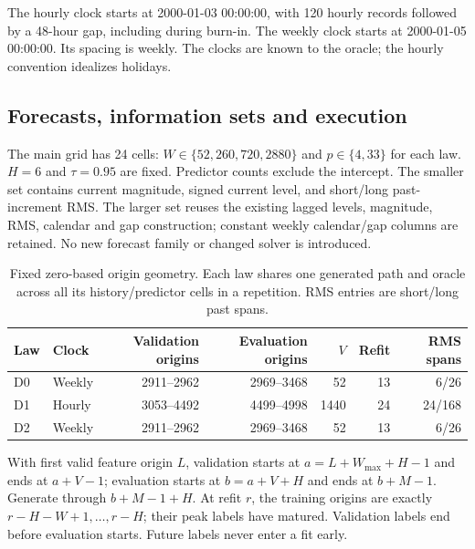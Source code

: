 The hourly clock starts at 2000-01-03 00:00:00, with 120 hourly records followed by a 48-hour gap, including during burn-in. The weekly clock starts at 2000-01-05 00:00:00. Its spacing is weekly. The clocks are known to the oracle; the hourly convention idealizes holidays.

\subsection{Forecasts, information sets and execution}\label{sup:v8-mc-procedure}

The main grid has 24 cells: $W\in\{52,260,720,2880\}$ and $p\in\{4,33\}$ for each law. $H=6$ and $\tau=0.95$ are fixed. Predictor counts exclude the intercept. The smaller set contains current magnitude, signed current level, and short/long past-increment RMS. The larger set reuses the existing lagged levels, magnitude, RMS, calendar and gap construction; constant weekly calendar/gap columns are retained. No new forecast family or changed solver is introduced.

\begin{table}[htbp]\centering\scriptsize

\caption{Fixed zero-based origin geometry. Each law shares one generated path and oracle across all its history/predictor cells in a repetition. RMS entries are short/long past spans.}\label{tab:v8-mc-geometry}

\begin{tabular}{llrrrrr}\toprule
Law & Clock & Validation origins & Evaluation origins & $V$ & Refit & RMS spans\\\midrule
D0 & Weekly & 2911--2962 & 2969--3468 & 52 & 13 & 6/26 \\
D1 & Hourly & 3053--4492 & 4499--4998 & 1440 & 24 & 24/168 \\
D2 & Weekly & 2911--2962 & 2969--3468 & 52 & 13 & 6/26 \\
\bottomrule\end{tabular}\end{table}

With first valid feature origin $L$, validation starts at $a=L+W_{\max}+H-1$ and ends at $a+V-1$; evaluation starts at $b=a+V+H$ and ends at $b+M-1$. Generate through $b+M-1+H$. At refit $r$, the training origins are exactly $r-H-W+1,\ldots,r-H$; their peak labels have matured. Validation labels end before evaluation starts. Future labels never enter a fit early.

